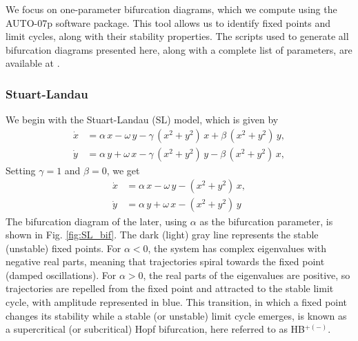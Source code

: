 We focus on one-parameter bifurcation diagrams, which we compute using the AUTO-07p software package. This tool allows us to identify fixed points and limit cycles, along with their stability properties. The scripts used to generate all bifurcation diagrams presented here, along with a complete list of parameters, are available at \cite{doedel2007auto07p}.

\subsubsection*{Stuart-Landau}
We begin with the Stuart-Landau (SL) model, which is given by
\begin{align}
  \dot{x} &= \alpha\,x - \omega\,y
           - \gamma\,(x^{2}+y^{2})\,x
           + \beta\,(x^{2}+y^{2})\,y,
  \label{eq:sl_cart_x2}\\
  \dot{y} &= \alpha\,y + \omega\,x
           - \gamma\,(x^{2}+y^{2})\,y
           - \beta\,(x^{2}+y^{2})\,x,
\end{align}
Setting $\gamma = 1$ and $\beta = 0$, we get
\begin{align}
  \dot{x} &= \alpha\,x - \omega\,y
           - (x^{2}+y^{2})\,x
           ,
  \\
  \dot{y} &= \alpha\,y + \omega\,x
           - (x^{2}+y^{2})\,y
\end{align}
The bifurcation diagram of the later, using $\alpha$ as the bifurcation parameter, is shown in Fig. \ref{fig:SL_bif}. The dark (light) gray line represents the stable (unstable) fixed points. For $\alpha < 0$, the system has complex eigenvalues with negative real parts, meaning that trajectories spiral towards the fixed point (damped oscillations). For $\alpha > 0$, the real parts of the eigenvalues are positive, so trajectories are repelled from the fixed point and attracted to the stable limit cycle, with amplitude represented in blue. This transition, in which a fixed point changes its stability while a stable (or unstable) limit cycle emerges, is known as a supercritical (or subcritical) Hopf bifurcation, here referred to as HB$^{+(-)}$.
 



